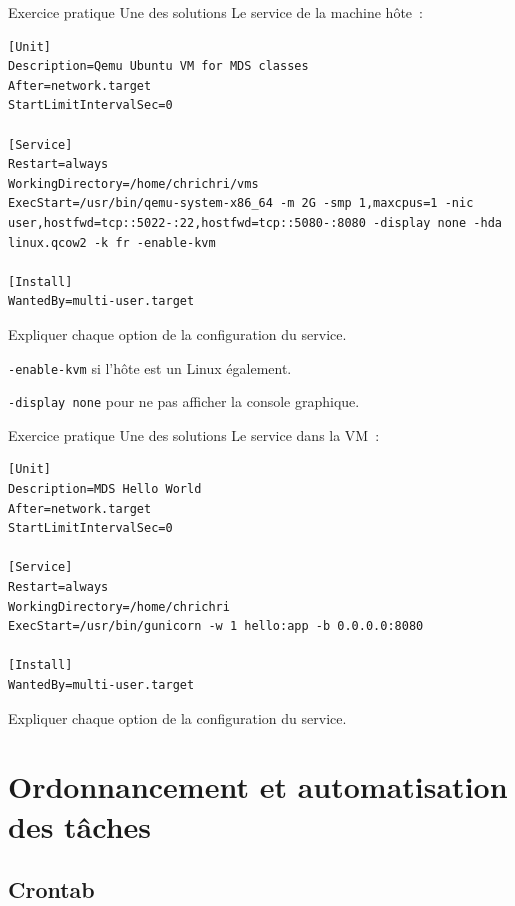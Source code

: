 \documentclass{beamer}
\begin{document}
    \begin{frame}[fragile]{Exercice pratique \execcounterdispinc{}}{Une des solutions}
        Le service de la machine hôte~:
        \begin{lstlisting}
[Unit]
Description=Qemu Ubuntu VM for MDS classes
After=network.target
StartLimitIntervalSec=0

[Service]
Restart=always
WorkingDirectory=/home/chrichri/vms
ExecStart=/usr/bin/qemu-system-x86_64 -m 2G -smp 1,maxcpus=1 -nic user,hostfwd=tcp::5022-:22,hostfwd=tcp::5080-:8080 -display none -hda linux.qcow2 -k fr -enable-kvm

[Install]
WantedBy=multi-user.target
        \end{lstlisting}
        Expliquer chaque option de la configuration du service.
        \pause
        \begin{dangercolorbox}
            \lstinline{-enable-kvm} si l'hôte est un Linux également.

            \lstinline{-display none} pour ne pas afficher la console graphique.
        \end{dangercolorbox}
    \end{frame}

    \begin{frame}[fragile]{Exercice pratique \execcounterdispinc{}}{Une des solutions}
        Le service dans la VM~:
        \begin{lstlisting}
[Unit]
Description=MDS Hello World
After=network.target
StartLimitIntervalSec=0

[Service]
Restart=always
WorkingDirectory=/home/chrichri
ExecStart=/usr/bin/gunicorn -w 1 hello:app -b 0.0.0.0:8080

[Install]
WantedBy=multi-user.target
        \end{lstlisting}
        Expliquer chaque option de la configuration du service.
    \end{frame}


    \section{Ordonnancement et automatisation des tâches}\label{sec:scheduling}

    \subsection{Crontab}\label{subsec:crontab}
\end{document}
